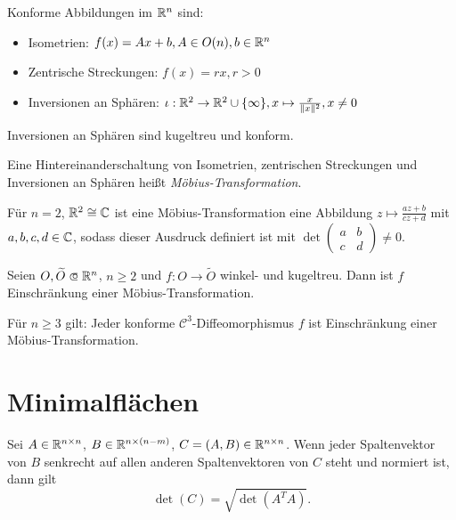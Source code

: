 \documentclass{cheat-sheet}
\begin{document}

\begin{bsp} Konforme Abbildungen im $\mathbb{R}^n$ sind:
  \begin{itemize}
    \item Isometrien: $f(x) = Ax + b, A \in O(n), b \in \mathbb{R}^n$
    \item Zentrische Streckungen: $f(x) = rx, r > 0$
    \item Inversionen an Sphären: $\iota : \mathbb{R}^2 \to \mathbb{R}^2 \cup \{ \infty \}, x \mapsto \tfrac{x}{\|x\|^2}, x \not= 0$
  \end{itemize}
\end{bsp}

\begin{lem}
  Inversionen an Sphären sind kugeltreu und konform.
\end{lem}

\begin{definition}
  Eine Hintereinanderschaltung von Isometrien, zentrischen Streckungen und Inversionen an Sphären heißt \emph{Möbius-Transformation}.
\end{definition}

\begin{bem}
  Für $n = 2$, $\mathbb{R}^2 \cong \mathbb{C}$ ist eine Möbius-Transformation eine Abbildung $z \mapsto \tfrac{az+b}{cz+d}$ mit $a, b, c, d \in \mathbb{C}$, sodass dieser Ausdruck definiert ist mit $\det \left( \begin{smallmatrix} a & b \\ c & d \end{smallmatrix} \right) \not= 0$.
\end{bem}

\begin{satz}
  Seien $O, \widetilde{O} \opn \R^n$, $n \geq 2$ und $f : O \to \widetilde{O}$ winkel- und kugeltreu. Dann ist $f$ Einschränkung einer Möbius-Transformation.
\end{satz}

\begin{kor}
  Für $n \geq 3$ gilt: Jeder konforme $\mathcal{C}^3$-Diffeomorphismus $f$ ist Einschränkung einer Möbius-Transformation.
\end{kor}


\section{Minimalflächen}

\begin{lem}
  Sei $A \in \mathbb{R}^{n \times n}$, $B \in \mathbb{R}^{n \times (n-m)}$, $C = (A, B) \in \mathbb{R}^{n \times n}$. Wenn jeder Spaltenvektor von $B$ senkrecht auf allen anderen Spaltenvektoren von $C$ steht und normiert ist, dann gilt
  \[ \det(C) = \sqrt{ \det(A^T A) }. \]
\end{lem}
\end{document}
